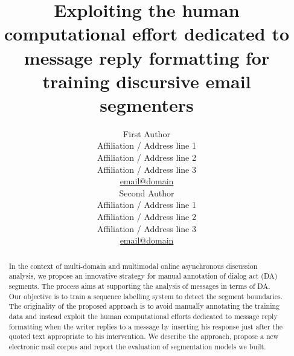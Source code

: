 \documentclass[11pt,a4paper]{article}
\title{Exploiting the human computational effort dedicated to message reply formatting for training discursive email segmenters} %
\author{First Author \\
  Affiliation / Address line 1 \\
  Affiliation / Address line 2 \\
  Affiliation / Address line 3 \\
  \url{email@domain} \\\And
  Second Author \\
  Affiliation / Address line 1 \\
  Affiliation / Address line 2 \\
  Affiliation / Address line 3 \\
  \url{email@domain} \\}
\date{}
\begin{document}
\maketitle
\begin{abstract}
In the context of multi-domain and multimodal online asynchronous discussion analysis, we propose an innovative strategy for manual annotation of dialog act (DA) segments. The process aims at supporting the analysis of messages in terms of DA.
Our objective is to train a sequence labelling system to detect the segment boundaries. %
The originality of the proposed approach is to avoid manually annotating the training data and instead exploit the human computational efforts dedicated to message reply formatting %
when the writer replies to a message by inserting his response just after the quoted text appropriate to his intervention.
%
We describe the approach, propose a new electronic mail corpus %
and report the evaluation of segmentation models we built.
\end{abstract}






















\end{document}
